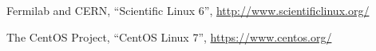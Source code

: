 \begin{thebibliography}{}
Fermilab and CERN,
``Scientific Linux 6'',
\url{http://www.scientificlinux.org/}

The CentOS Project,
``CentOS Linux 7'',
\url{https://www.centos.org/}






\end{thebibliography}




